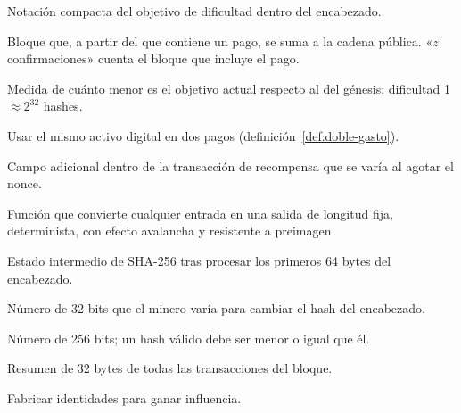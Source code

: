 \documentclass[11pt,a4paper]{article}
\begin{document}
\begin{description}[leftmargin=1.2em,labelindent=0pt,itemsep=2pt,font=\bfseries\sffamily\small]
  \item[Bits (campo)] Notación compacta del objetivo de dificultad dentro del encabezado.
  \item[Confirmación] Bloque que, a partir del que contiene un pago, se suma a la cadena pública. «$z$ confirmaciones» cuenta el bloque que incluye el pago.
  \item[Dificultad] Medida de cuánto menor es el objetivo actual respecto al del génesis; dificultad 1 $\approx 2^{32}$ hashes.
  \item[Doble gasto] Usar el mismo activo digital en dos pagos (definición~\ref{def:doble-gasto}).
  \item[Extranonce] Campo adicional dentro de la transacción de recompensa que se varía al agotar el nonce.
  \item[Hash criptográfico] Función que convierte cualquier entrada en una salida de longitud fija, determinista, con efecto avalancha y resistente a preimagen.
  \item[Midstate] Estado intermedio de SHA-256 tras procesar los primeros 64 bytes del encabezado.
  \item[Nonce] Número de 32 bits que el minero varía para cambiar el hash del encabezado.
  \item[Objetivo (\emph{target})] Número de 256 bits; un hash válido debe ser menor o igual que él.
  \item[Raíz de Merkle] Resumen de 32 bytes de todas las transacciones del bloque.
  \item[Sybil, ataque] Fabricar identidades para ganar influencia.
\end{description}
\end{document}
